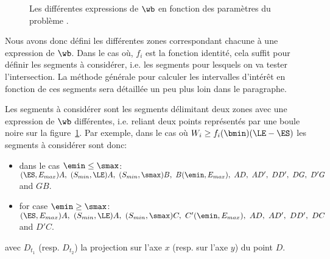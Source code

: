 \begin{figure}[!htb]
{

}
\caption{Les différentes expressions de $\wb$ en fonction des
  paramètres du problème \CECSP.}
\label{fig:breakline_nrj}
\end{figure}

Nous avons donc défini les différentes zones correspondant chacune à
une expression de $\wb$. Dans le cas où, $f_i$ est la fonction
identité, cela suffit pour définir les segments à considérer, i.e. les
segments pour lesquels on va tester l'intersection. La méthode
générale pour calculer les intervalles d'intérêt en fonction de ces
segments sera détaillée un peu plus loin dans le paragraphe. 

Les segments à considérer sont les segments délimitant deux zones avec
une expression de $\wb$ différentes, i.e. reliant deux points
représentés par une boule noire sur la
figure~\ref{fig:breakline_nrj}. Par exemple, dans le cas où $W_i \ge
f_i(\bmin)(\LE-\ES)$ les segments à considérer sont donc:
\begin{itemize}
\item dans le cas $\emin \le \smax$: $(\ES ,E_{max})A,\ (S_{min},
\LE)A,\ (S_{min},\smax)B,\ B(\emin,E_{max}),\ AD,\ AD',\
DD' ,\ DG,\ D'G$ and $GB$.
\item for case $\emin\ge \smax$: $(\ES ,E_{max})A,\ (S_{min},
\LE)A,\ (S_{min},\smax)C,\ C'(\emin,E_{max}),\ AD,\ AD',\
DD' ,\ DC$ and $D'C$.
\end{itemize}
avec $D_{t_1}$ (resp. $D_{t_2}$) la projection sur l'axe $x$
(resp. sur l'axe $y$) du point $D$.


